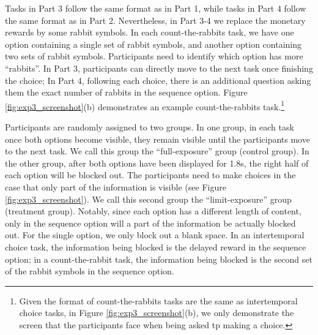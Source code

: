 \documentclass[
  12pt,
]{article}
\begin{document}
Tasks in Part 3 follow the same format as in Part 1, while tasks in Part
4 follow the same format as in Part 2. Nevertheless, in Part 3-4 we
replace the monetary rewards by some rabbit symbols. In each
count-the-rabbits task, we have one option containing a single set of
rabbit symbols, and another option containing two sets of rabbit
symbols. Participants need to identify which option has more
``rabbits''. In Part 3, participants can directly move to the next task
once finishing the choice; In Part 4, following each choice, there is an
additional question asking them the exact number of rabbits in the
sequence option. Figure \ref{fig:exp3_screenshot}(b) demonstrates an
example count-the-rabbits task.\footnote{Given the format of
  count-the-rabbits tasks are the same as intertemporal choice tasks, in
  Figure \ref{fig:exp3_screenshot}(b), we only demonstrate the screen
  that the participants face when being asked tp making a choice.}

Participants are randomly assigned to two groups. In one group, in each
task once both options become visible, they remain visible until the
participants move to the next task. We call this group the
``full-exposure'' group (control group). In the other group, after both
options have been displayed for 1.8s, the right half of each option will
be blocked out. The participants need to make choices in the case that
only part of the information is visible (see Figure
\ref{fig:exp3_screenshot}). We call this second group the
``limit-exposure'' group (treatment group). Notably, since each option
has a different length of content, only in the sequence option will a
part of the information be actually blocked out. For the single option,
we only block out a blank space. In an intertemporal choice task, the
information being blocked is the delayed reward in the sequence option;
in a count-the-rabbit task, the information being blocked is the second
set of the rabbit symbols in the sequence option.
\end{document}
